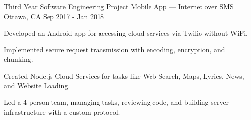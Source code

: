 
\begin{cventries}
	\cventry
		{Third Year Software Engineering Project}
		{Mobile App --- Internet over SMS}
		{Ottawa, CA}
		{Sep 2017 - Jan 2018}
		{\begin{cvitems}
			\item Developed an Android app for accessing cloud services via Twilio without WiFi.
			\item Implemented secure request transmission with encoding, encryption, and chunking.
			\item Created Node.js Cloud Services for tasks like Web Search, Maps, Lyrics, News, and Website Loading.
			\item Led a 4-person team, managing tasks, reviewing code, and building server infrastructure with a custom protocol.
		\end{cvitems}}
\end{cventries}
